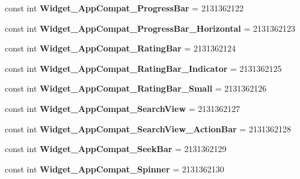 \begin{DoxyCompactItemize}
const int {\bfseries Widget\+\_\+\+App\+Compat\+\_\+\+Progress\+Bar} = 2131362122
\item 
\mbox{\label{classXaria_1_1Resource_1_1Style_a5d170d88de7f7ae41ef995c2663424a1}} 
const int {\bfseries Widget\+\_\+\+App\+Compat\+\_\+\+Progress\+Bar\+\_\+\+Horizontal} = 2131362123
\item 
\mbox{\label{classXaria_1_1Resource_1_1Style_a9d2fdaa9f72dacae273a17ce3d065269}} 
const int {\bfseries Widget\+\_\+\+App\+Compat\+\_\+\+Rating\+Bar} = 2131362124
\item 
\mbox{\label{classXaria_1_1Resource_1_1Style_a7ccd2a19d20c84cc319378f66364411e}} 
const int {\bfseries Widget\+\_\+\+App\+Compat\+\_\+\+Rating\+Bar\+\_\+\+Indicator} = 2131362125
\item 
\mbox{\label{classXaria_1_1Resource_1_1Style_a5ca279445a248fd44c9bdc97a93fd780}} 
const int {\bfseries Widget\+\_\+\+App\+Compat\+\_\+\+Rating\+Bar\+\_\+\+Small} = 2131362126
\item 
\mbox{\label{classXaria_1_1Resource_1_1Style_ad88c90439b770499186663b079ff250a}} 
const int {\bfseries Widget\+\_\+\+App\+Compat\+\_\+\+Search\+View} = 2131362127
\item 
\mbox{\label{classXaria_1_1Resource_1_1Style_a50966d573a022ab4ce597e09bbe72106}} 
const int {\bfseries Widget\+\_\+\+App\+Compat\+\_\+\+Search\+View\+\_\+\+Action\+Bar} = 2131362128
\item 
\mbox{\label{classXaria_1_1Resource_1_1Style_a0dbc818168e156466c497b1932b6f4cb}} 
const int {\bfseries Widget\+\_\+\+App\+Compat\+\_\+\+Seek\+Bar} = 2131362129
\item 
\mbox{\label{classXaria_1_1Resource_1_1Style_a7bea64c64566b84ff2079021e4459faa}} 
const int {\bfseries Widget\+\_\+\+App\+Compat\+\_\+\+Spinner} = 2131362130
\item 
\mbox{\label{classXaria_1_1Resource_1_1Style_a221d00d593334a2f1844baa581e80730}} 

\end{DoxyCompactItemize}
